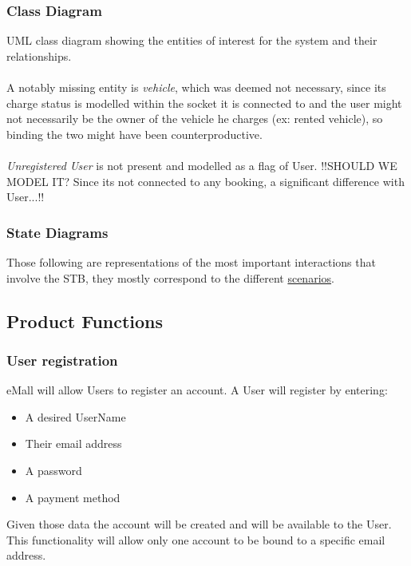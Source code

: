 \documentclass[11pt]{article}
\begin{document}
\subsubsection{Class Diagram}

UML class diagram showing the entities of interest for the system and their relationships. \\
\\
A notably missing entity is \textit{vehicle}, which was deemed not necessary, since its charge status is modelled within the socket it is connected to and the user might not necessarily be the owner of the vehicle he charges (ex: rented vehicle), so binding the two might have been counterproductive. \\
\\
\textit{Unregistered User} is not present and modelled as a flag of User. !!SHOULD WE MODEL IT? Since its not connected to any booking, a significant difference with User...!! 

\subsubsection{State Diagrams}

Those following are representations of the most important interactions that involve the STB, they mostly correspond to the different \hyperref[subsubsec:scenarios]{scenarios}.

\subsection{Product Functions}
\label{subsec:prodfunctions}

\subsubsection{User registration}

eMall will allow Users to register an account. A User will register by entering:
\begin{itemize}
    \item A desired UserName
    \item Their email address
    \item A password
    \item A payment method
\end{itemize}
Given those data the account will be created and will be available to the User. This functionality will allow only one account to be bound to a specific email address.
\end{document}
